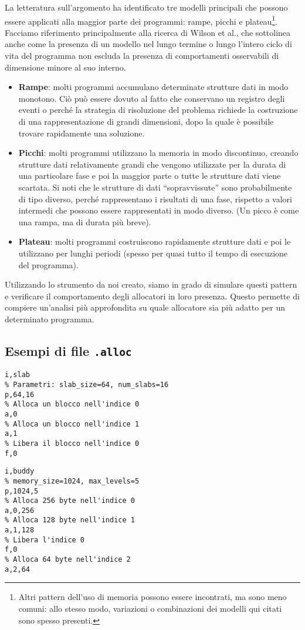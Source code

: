 La letteratura sull'argomento ha identificato tre modelli principali che possono essere applicati alla maggior parte dei programmi: rampe, picchi e plateau\footnote{Altri pattern dell'uso di memoria possono essere incontrati, ma sono meno comuni: allo stesso modo, variazioni o combinazioni dei modelli qui citati sono spesso presenti.}. Facciamo riferimento principalmente alla ricerca di Wilson et al., che sottolinea anche come la presenza di un modello nel lungo termine o lungo l'intero ciclo di vita del programma non escluda la presenza di comportamenti osservabili di dimensione minore al suo interno.
\begin{itemize}
  \item \textbf{Rampe}: molti programmi accumulano determinate strutture dati in modo monotono. Ciò può essere dovuto al fatto che conservano un registro degli eventi o perché la strategia di risoluzione del problema richiede la costruzione di una rappresentazione di grandi dimensioni, dopo la quale è possibile trovare rapidamente una soluzione.
  \item \textbf{Picchi}: molti programmi utilizzano la memoria in modo discontinuo, creando strutture dati relativamente grandi che vengono utilizzate per la durata di una particolare fase e poi la maggior parte o tutte le strutture dati viene scartata. Si noti che le strutture di dati “sopravvissute” sono probabilmente di tipo diverso, perché rappresentano i risultati di una fase, rispetto a valori intermedi che possono essere rappresentati in modo diverso. (Un picco è come una rampa, ma di durata più breve).
  \item \textbf{Plateau}: molti programmi costruiscono rapidamente strutture dati e poi le utilizzano per lunghi periodi (spesso per quasi tutto il tempo di esecuzione del programma).
\end{itemize}

Utilizzando lo strumento da noi creato, siamo in grado di simulare questi pattern e verificare il comportamento degli allocatori in loro presenza. Questo permette di compiere un'analisi più approfondita su quale allocatore sia più adatto per un determinato programma.

\pagebreak

\subsection{Esempi di file \texttt{.alloc}}
\begin{lstlisting}[language={}]
% Tipo di allocatore (Slab)
i,slab         
% Parametri: slab_size=64, num_slabs=16
p,64,16        
% Alloca un blocco nell'indice 0
a,0            
% Alloca un blocco nell'indice 1
a,1            
% Libera il blocco nell'indice 0
f,0      
\end{lstlisting}      
\begin{lstlisting}[language={}]
% Benchmark per allocatore variabile
i,buddy
% memory_size=1024, max_levels=5
p,1024,5       
% Alloca 256 byte nell'indice 0
a,0,256        
% Alloca 128 byte nell'indice 1
a,1,128        
% Libera l'indice 0
f,0            
% Alloca 64 byte nell'indice 2
a,2,64         
\end{lstlisting}




